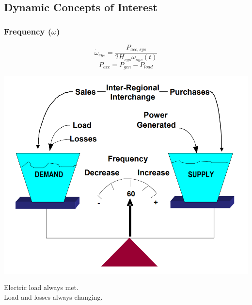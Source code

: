 \documentclass[14pt, unknownkeysallowed]{beamer}
\begin{document}
\subsection{Dynamic Concepts of Interest}
\begin{frame}
\frametitle{Frequency ($\omega$)}
\begin{minipage}[t][.55\textheight][t]{\textwidth}
	\begin{minipage}{.4\linewidth}
\vspace{-2em}
\[ \dot{\omega}_{sys} = \dfrac{P_{acc, sys}}{2H_{sys}\omega_{sys}(t) } \]
\[ P_{acc} = P_{gen} - P_{load} \]
	
\end{minipage}%
\begin{minipage}{.6\linewidth}
\vspace{-2em}
    \begin{center}
     \includegraphics[width=\linewidth]{freqScale}   {\tiny\cite{freqScale}}%
     \end{center}
\end{minipage}
\end{minipage}
Electric load always met.\\
\vspace{.5 em}
Load and losses always changing.
\end{frame}
\end{document}
